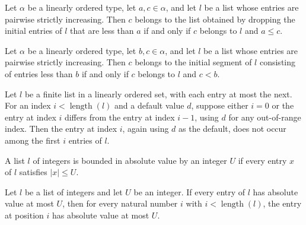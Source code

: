 \begin{theorem}
\label{List.mem_dropWhile_lt}
\leanok
{}
Let $\alpha$ be a linearly ordered type, let $a,c\in\alpha$, and let $l$ be a list whose
entries are pairwise strictly increasing. Then $c$ belongs to the list obtained by
dropping the initial entries of $l$ that are less than $a$ if and only if $c$ belongs to
$l$ and $a\le c$.
\end{theorem}

\begin{theorem}
\label{List.mem_takeWhile_lt}
\leanok
{}
Let $\alpha$ be a linearly ordered type, let $b,c\in\alpha$, and let $l$ be a list whose
entries are pairwise strictly increasing. Then $c$ belongs to the initial segment of $l$
consisting of entries less than $b$ if and only if $c$ belongs to $l$ and $c<b$.
\end{theorem}

\begin{theorem}
\label{List.getD_notMem_take_of_sorted}
\leanok
{}
Let $l$ be a finite list in a linearly ordered set, with each entry at most the next.
For an index $i<\operatorname{length}(l)$ and a default value $d$, suppose either $i=0$
or the entry at index $i$ differs from the entry at index $i-1$, using $d$ for any
out-of-range index. Then the entry at index $i$, again using $d$ as the default, does
not occur among the first $i$ entries of $l$.
\end{theorem}

\begin{definition}
\label{Light.AbsLe}
\leanok
A list $l$ of integers is bounded in absolute value by an integer $U$ if every entry $x$
of $l$ satisfies $|x|\le U$.
\end{definition}

\begin{theorem}
\label{Light.AbsLe.getElem}
\leanok
{}
Let $l$ be a list of integers and let $U$ be an integer. If every entry of $l$ has
absolute value at most $U$, then for every natural number $i$ with
$i<\operatorname{length}(l)$, the entry at position $i$ has absolute value at most $U$.
\end{theorem}

